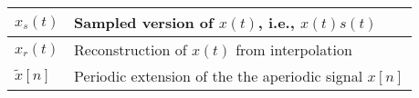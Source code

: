 \begin{xltabular}{\textwidth}{XX}
	\(x_s(t)\)                                                                                            & Sampled version of \(x(t)\), i.e., \(x(t)s(t)\)                                                                                                                                                                                                                                                                                                                                                                                                          \\ \hline
	\(x_r(t)\)                                                                                            & Reconstruction of \(x(t)\) from interpolation                                                                                                                                                                                                                                                                                                                                                                                                            \\ \hline
	\(\tilde{x}[n]\)                                                                                      & Periodic extension of the the aperiodic signal \(x[n]\)                                                                                                                                                                                                                                                                                                                                                                                                  \\ \hline
\end{xltabular}
